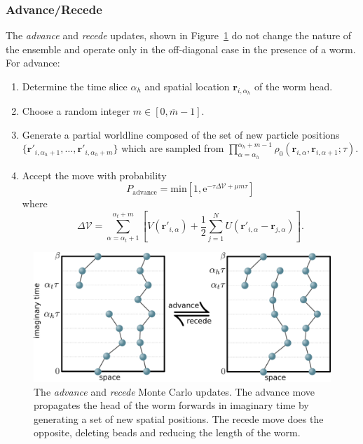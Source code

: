 \documentclass[prb,aps,amssym,nofootinbib,floatfix,notitlepage]{revtex4-1}
\renewcommand{\vec}[1]{\boldsymbol{#1}}
\newcommand{\e}[1]{\mathrm{e}^{#1}}
\begin{document}
\subsubsection{Advance/Recede}
The \emph{advance} and \emph{recede} updates, shown in
 Figure~\ref{fig:advancerecede} do not change the nature of the
ensemble and operate only in the off-diagonal case in the presence of a worm.
For advance:
\begin{enumerate}
    \item Determine the time slice $\alpha_h$ and spatial location
        $\vec{r}_{i,\alpha_h}$ of the worm head.
    \item Choose a random integer $m \in [0,\overline{m}-1]$.
    \item Generate a partial worldline composed of the set of new particle positions 
        $\{\vec{r}'_{i,\alpha_h+1},\ldots, \vec{r}'_{i,\alpha_h+m}\}$ which are
        sampled from $\prod_{\alpha=\alpha_h}^{\alpha_h+m-1}
    \rho_0(\vec{r}_{i,\alpha},\vec{r}_{i,\alpha+1};\tau)$.
\item Accept the move with probability
\begin{equation}
    P_{\text{advance}} = \mathrm{min} \left[1,
    \e{-\tau \Delta \mathcal{V} + \mu m \tau} \right]
\end{equation}
%
where
%
\begin{equation}
    \Delta\mathcal{V} = \sum_{\alpha=\alpha_t+1}^{\alpha_t+m} \left[ 
        V(\vec{r}'_{i,\alpha}) + \frac{1}{2}\sum_{j=1}^N
        U(\vec{r}'_{i,\alpha}-\vec{r}_{j,\alpha}) \right].
\end{equation}
%
\end{enumerate}

%
\begin{figure}
\begin{center}
\includegraphics[width=0.70\columnwidth]{Figures/advancerecede.pdf}
\end{center}
\caption{The \emph{advance} and \emph{recede} Monte Carlo updates.  The advance
    move propagates the head of the worm forwards in imaginary time by
    generating a set of new spatial positions.  The recede move does the
opposite, deleting beads and reducing the length of the worm.}
\label{fig:advancerecede}
 \end{figure}
%
\end{document}
